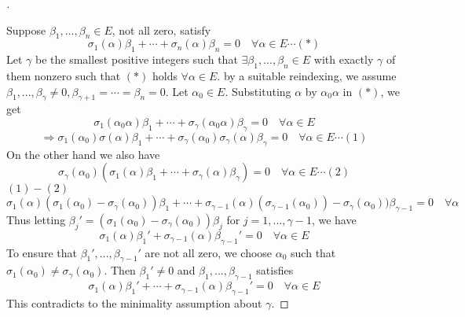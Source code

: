 \documentclass{article}
\theoremstyle{definition}
\newenvironment{proofs}[1][\proofname]{%
  \begin{proof}[#1]$ $\par\nobreak\ignorespaces
}{%
  \end{proof}
}
\newcommand{\Ra}{\Rightarrow}
\begin{document}
\begin{proofs}
	Suppose $\beta_1, ..., \beta_n \in E$, not all zero, satisfy
	\[
		\sigma_1(\alpha) \beta_1 + \cdots + \sigma_n(\alpha) \beta_n = 0 \quad \forall \alpha \in E \cdots (*)
	\]
	Let $\gamma$ be the smallest positive integers such that $\exists \beta_1, ..., \beta_n \in E$ with exactly $\gamma$ of them nonzero such that $(*)$ holds $\forall \alpha \in E$.
	by a suitable reindexing, we assume $\beta_1, ..., \beta_{\gamma} \neq 0, \beta_{\gamma + 1} = \cdots = \beta_n = 0$.
	Let $\alpha_0 \in E$.
	Substituting $\alpha$ by $\alpha_0 \alpha$ in $(*)$, we get
	\[
		\sigma_1 (\alpha_0 \alpha) \beta_1 + \cdots + \sigma_{\gamma}(\alpha_0 \alpha) \beta_\gamma = 0 \quad \forall \alpha \in E
	\]
	\[
		\Ra \sigma_1 (\alpha_0) \sigma(\alpha) \beta_1 + \cdots + \sigma_{\gamma} (\alpha_0) \sigma_{\gamma}(\alpha) \beta_\gamma = 0 \quad \forall  \alpha \in E \cdots (1)
	\]
	On the other hand we also have
	\[
		\sigma_\gamma(\alpha_0) (\sigma_1(\alpha) \beta_1 + \cdots + \sigma_{\gamma}(\alpha) \beta_\gamma) = 0 \quad \forall \alpha \in E \cdots (2)
	\]
	$(1) - (2)$
	\[
		\sigma_1(\alpha)(\sigma_1(\alpha_0) - \sigma_\gamma(\alpha_0))\beta_1 + \cdots + \sigma_{\gamma - 1}(\alpha) (\sigma_{\gamma - 1}(\alpha_0)) - \sigma_{\gamma}(\alpha_0)) \beta_{\gamma - 1} = 0 \quad \forall \alpha
	\]
	Thus letting $\beta_j' = (\sigma_1(\alpha_0) - \sigma_{\gamma}(\alpha_0)) \beta_j$ for $j = 1, ..., \gamma - 1$, we have
	\[
		\sigma_1(\alpha) \beta_1' + \sigma_{\gamma - 1}(\alpha) \beta_{\gamma - 1}' = 0 \quad \forall \alpha \in E
	\]
	To ensure that $\beta_1', ..., \beta_{\gamma - 1}'$ are not all zero, we choose $\alpha_0$ such that $\sigma_1(\alpha_0) \neq \sigma_{\gamma}(\alpha_0)$.
	Then $\beta_1' \neq 0$ and $\beta_1, ..., \beta_{\gamma - 1}$ satisfies
	\[
		\sigma_1(\alpha) \beta_1' + \cdots + \sigma_{\gamma - 1}(\alpha) \beta_{\gamma - 1}' = 0 \quad \forall \alpha \in E
	\]
	This contradicts to the minimality assumption about $\gamma$.
\end{proofs}
\end{document}
